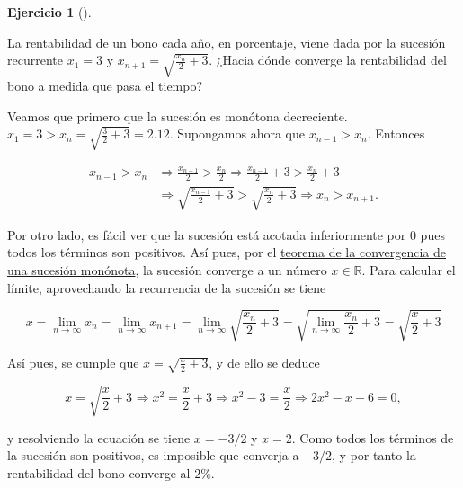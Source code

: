\documentclass[
  spanish,
  a4paper,
]{scrreport}
\theoremstyle{definition}
\newtheorem{exercise}{Ejercicio}[chapter]
\theoremstyle{remark}
\begin{document}
\begin{exercise}[]\protect\hypertarget{exr-3}{}\label{exr-3}

La rentabilidad de un bono cada año, en porcentaje, viene dada por la
sucesión recurrente \(x_1=3\) y \(x_{n+1}=\sqrt{\frac{x_n}{2}+3}\).
¿Hacia dónde converge la rentabilidad del bono a medida que pasa el
tiempo?

\end{exercise}

\begin{tcolorbox}[enhanced jigsaw, arc=.35mm, bottomrule=.15mm, bottomtitle=1mm, breakable, colback=white, colbacktitle=quarto-callout-tip-color!10!white, colframe=quarto-callout-tip-color-frame, coltitle=black, left=2mm, leftrule=.75mm, opacityback=0, opacitybacktitle=0.6, rightrule=.15mm, title=\textcolor{quarto-callout-tip-color}{\faLightbulb}\hspace{0.5em}{Solución}, titlerule=0mm, toprule=.15mm, toptitle=1mm]

Veamos que primero que la sucesión es monótona decreciente.
\(x_1=3>x_n= \sqrt{\frac{3}{2}+3} = 2.12\). Supongamos ahora que
\(x_{n-1}>x_n\). Entonces

\begin{align*}
x_{n-1}>x_n &\Rightarrow \frac{x_{n-1}} {2}>\frac{x_n}{2} \Rightarrow \frac{x_{n-1}}{2}+3>\frac{x_n}{2}+3\\  & \Rightarrow \sqrt{\frac{x_{n-1}}{2}+3}>\sqrt{\frac{x_n}{2}+3} \Rightarrow x_n>x_{n+1}.
\end{align*} \[
\]

Por otro lado, es fácil ver que la sucesión está acotada inferiormente
por \(0\) pues todos los términos son positivos. Así pues, por el
\href{https://aprendeconalf.es/analisis-manual/sucesiones.html\#thm-convergencia-monotona}{teorema
de la convergencia de una sucesión monónota}, la sucesión converge a un
número \(x\in\mathbb{R}\). Para calcular el límite, aprovechando la
recurrencia de la sucesión se tiene

\[
x=\lim_{n\to\infty} x_n = \lim_{n\to\infty} x_{n+1} = \lim_{n\to\infty} \sqrt{\frac{x_n}{2}+3} = \sqrt{\lim_{n\to\infty}\frac{x_n}{2}+3} = \sqrt{\frac{x}{2}+3}
\]

Así pues, se cumple que \(x=\sqrt{\frac{x}{2}+3}\), y de ello se deduce

\[
x=\sqrt{\frac{x}{2}+3} \Rightarrow x^2=\frac{x}{2}+3 \Rightarrow x^2-3 = \frac{x}{2} \Rightarrow 2x^2-x-6 =0,\]

y resolviendo la ecuación se tiene \(x=-3/2\) y \(x=2\). Como todos los
términos de la sucesión son positivos, es imposible que converja a
\(-3/2\), y por tanto la rentabilidad del bono converge al \(2\)\%.

\end{tcolorbox}
\end{document}
